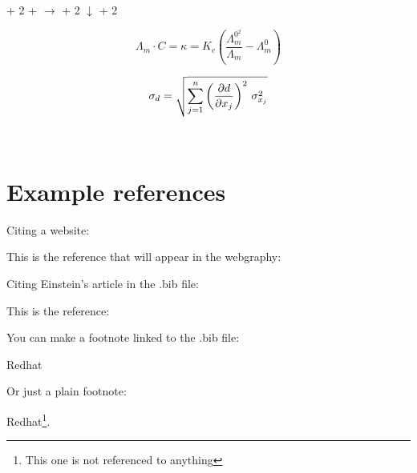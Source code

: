 \documentclass[a4paper,twoside,11pt]{article}
\begin{document}
\begin{center}
 + 2 +  $\longrightarrow$  + 2 $\downarrow$ + 2
\end{center}


\begin{equation}
\Lambda_{m} \cdot C = \kappa = K_{c}\left( \frac{\Lambda_{m}^{0^2}}{\Lambda_{m}}-\Lambda_{m}^{0}\right)
\end{equation}

\begin{equation}
\sigma_{d}=\sqrt{\sum \limits_{j=1}^n \left(\frac{\partial d}{\partial x_j}\right)^{2}\,\sigma^{2}_{x_j}}\\[0.5cm]
\end{equation}

\\



\newpage
\section{Example references}
Citing a website:

\begin{center}
    This is the reference that will appear in the webgraphy: \cite{windows}
\end{center}

Citing Einstein's article in the .bib file:

\begin{center}
    This is the reference: \cite{einstein}
\end{center}

You can make a footnote linked to the .bib file:
\begin{center}
    Redhat \autocite{redhat}
\end{center}
Or just a plain footnote:
\begin{center}
    Redhat\footnote{This one is not referenced to anything}.
\end{center}

\newpage





\printbibliography[heading=bibintoc,title={Referencias}]
\printbibliography[heading=subbibintoc,type=online,title={Webgrafía}]
\printbibliography[heading=subbibintoc,type=article,title={Artículos}]
\end{document}
